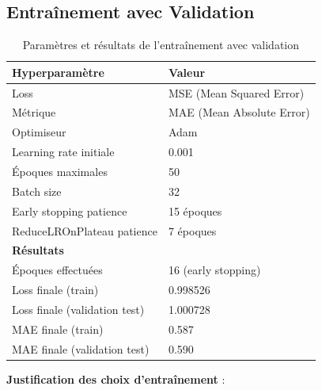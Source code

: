 \documentclass[12pt,a4paper]{article}
\begin{document}
\subsection{Entraînement avec Validation}

\begin{table}[H]
\centering
\begin{tabular}{ll}
\toprule
\textbf{Hyperparamètre} & \textbf{Valeur} \\
\midrule
Loss & MSE (Mean Squared Error) \\
Métrique & MAE (Mean Absolute Error) \\
Optimiseur & Adam \\
Learning rate initiale & 0.001 \\
Époques maximales & 50 \\
Batch size & 32 \\
Early stopping patience & 15 époques \\
ReduceLROnPlateau patience & 7 époques \\
\midrule
\textbf{Résultats} & \\
Époques effectuées & 16 (early stopping) \\
Loss finale (train) & 0.998526 \\
Loss finale (validation test) & 1.000728 \\
MAE finale (train) & 0.587 \\
MAE finale (validation test) & 0.590 \\
\bottomrule
\end{tabular}
\caption{Paramètres et résultats de l'entraînement avec validation}
\end{table}

\textbf{Justification des choix d'entraînement} :
\end{document}
